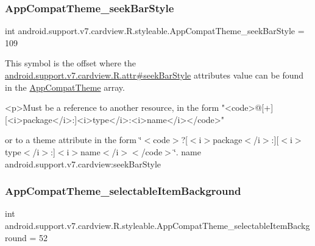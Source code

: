 \subsubsection{\texorpdfstring{App\+Compat\+Theme\+\_\+seek\+Bar\+Style}{AppCompatTheme\_seekBarStyle}}
{\footnotesize\ttfamily int android.\+support.\+v7.\+cardview.\+R.\+styleable.\+App\+Compat\+Theme\+\_\+seek\+Bar\+Style = 109\hspace{0.3cm}{\ttfamily [static]}}

This symbol is the offset where the \hyperlink{classandroid_1_1support_1_1v7_1_1cardview_1_1R_1_1attr_a4b3940a1b30e07edae0bc72456dd2944}{android.\+support.\+v7.\+cardview.\+R.\+attr\#seek\+Bar\+Style} attribute\textquotesingle{}s value can be found in the \hyperlink{classandroid_1_1support_1_1v7_1_1cardview_1_1R_1_1styleable_a52e6f69f954ecc2622d72c0b4d298938}{App\+Compat\+Theme} array.

\begin{DoxyVerb}      <p>Must be a reference to another resource, in the form "<code>@[+][<i>package</i>:]<i>type</i>:<i>name</i></code>"
\end{DoxyVerb}
 or to a theme attribute in the form \char`\"{}$<$code$>$?\mbox{[}$<$i$>$package$<$/i$>$\+:\mbox{]}\mbox{[}$<$i$>$type$<$/i$>$\+:\mbox{]}$<$i$>$name$<$/i$>$$<$/code$>$\char`\"{}.  name android.\+support.\+v7.\+cardview\+:seek\+Bar\+Style \mbox{\label{classandroid_1_1support_1_1v7_1_1cardview_1_1R_1_1styleable_add903683547560a9e09d1884a4359c03}} 
\subsubsection{\texorpdfstring{App\+Compat\+Theme\+\_\+selectable\+Item\+Background}{AppCompatTheme\_selectableItemBackground}}
{\footnotesize\ttfamily int android.\+support.\+v7.\+cardview.\+R.\+styleable.\+App\+Compat\+Theme\+\_\+selectable\+Item\+Background = 52\hspace{0.3cm}{\ttfamily [static]}}

